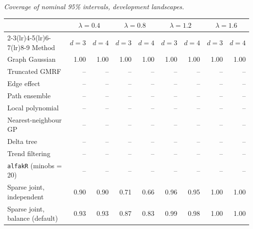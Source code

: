 \par\medskip\noindent\begin{minipage}{\linewidth}
\textit{Coverage of nominal 95\% intervals, development landscapes.}
\begin{center}
\footnotesize
\setlength{\tabcolsep}{3.5pt}
\begin{tabular}{l*{8}{r}}
\toprule
 & \multicolumn{2}{c}{$\lambda=0.4$} & \multicolumn{2}{c}{$\lambda=0.8$} & \multicolumn{2}{c}{$\lambda=1.2$} & \multicolumn{2}{c}{$\lambda=1.6$} \\
\cmidrule(lr){2-3}\cmidrule(lr){4-5}\cmidrule(lr){6-7}\cmidrule(lr){8-9}
Method & $d=3$ & $d=4$ & $d=3$ & $d=4$ & $d=3$ & $d=4$ & $d=3$ & $d=4$ \\
\midrule
Graph Gaussian & 1.00 & 1.00 & 1.00 & 1.00 & 1.00 & 1.00 & 1.00 & 1.00 \\
Truncated GMRF & -- & -- & -- & -- & -- & -- & -- & -- \\
Edge effect & -- & -- & -- & -- & -- & -- & -- & -- \\
Path ensemble & -- & -- & -- & -- & -- & -- & -- & -- \\
Local polynomial & -- & -- & -- & -- & -- & -- & -- & -- \\
Nearest-neighbour GP & -- & -- & -- & -- & -- & -- & -- & -- \\
Delta tree & -- & -- & -- & -- & -- & -- & -- & -- \\
Trend filtering & -- & -- & -- & -- & -- & -- & -- & -- \\
\texttt{alfakR} (minobs = 20) & -- & -- & -- & -- & -- & -- & -- & -- \\
Sparse joint, independent & 0.90 & 0.90 & 0.71 & 0.66 & 0.96 & 0.95 & 1.00 & 1.00 \\
Sparse joint, balance (default) & 0.93 & 0.93 & 0.87 & 0.83 & 0.99 & 0.98 & 1.00 & 1.00 \\
\bottomrule
\end{tabular}
\end{center}
\end{minipage}

